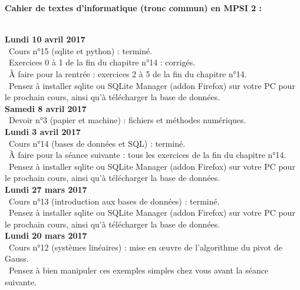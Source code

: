 \documentclass[12pt,a4paper]{article}
\begin{document}
\begin{center}
\Large\bf Cahier de textes d'informatique (tronc commun) en MPSI 2 :
\end{center}
\vspace{1cm}
\vspace{.4cm}\\

\noindent\textbf{Lundi 10 avril 2017}\\
\bu\ Cours n°15 (sqlite et python) : terminé.\\
\bu\ Exercices 0 à 1 de la fin du chapitre n°14 : corrigés.\\
\bu\ À faire pour la rentrée : exercices 2 à 5 de la fin du chapitre n°14.\\
\bu\ Pensez à installer sqlite ou SQLite Manager (addon Firefox) sur votre PC pour le prochain cours, ainsi qu'à télécharger la base de données. \vspace{.4cm}\\

\noindent\textbf{Samedi 8 avril 2017}\\
\bu\ Devoir n°3 (papier et machine) : fichiers et méthodes numériques. \vspace{.4cm}\\

\noindent\textbf{Lundi 3 avril 2017}\\
\bu\ Cours n°14 (bases de données et SQL) : terminé.\\
\bu\ À faire pour la séance suivante : tous les exercices de la fin du chapitre n°14.\\
\bu\ Pensez à installer sqlite ou SQLite Manager (addon Firefox) sur votre PC pour le prochain cours, ainsi qu'à télécharger la base de données. \vspace{.4cm}\\

\noindent\textbf{Lundi 27 mars 2017}\\
\bu\ Cours n°13 (introduction aux bases de données) : terminé.\\
\bu\ Pensez à installer sqlite ou SQLite Manager (addon Firefox) sur votre PC pour le prochain cours, ainsi qu'à télécharger la base de données. \vspace{.4cm}\\

\noindent\textbf{Lundi 20 mars 2017}\\
\bu\ Cours n°12 (systèmes linéaires) : mise en {\oe}uvre de l'algorithme du pivot de Gauss.\\
\bu\ Pensez à bien manipuler ces exemples simples chez vous avant la séance suivante. \vspace{.4cm}\\
\end{document}
